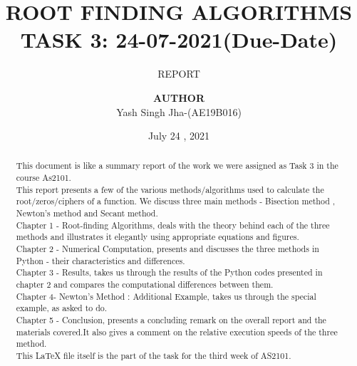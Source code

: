 \documentclass[a4paper, 12pt]{report}
\institute{Department Of Aerospace Engineering}
\title{ROOT FINDING ALGORITHMS\\TASK 3: 24-07-2021(Due-Date) }
\subtitle{REPORT}
\author{\textbf{AUTHOR}\\Yash Singh Jha-(AE19B016)\\ }
\date{July 24 , 2021}
\begin{document}
    \maketitle
    \romantableofcontents
    \listoffigures
    \listoftables
    \begin{abstract}
    This document is like a summary report of the work we were assigned as Task 3 in the course As2101.\\
    This report presents a few of the various methods/algorithms used to calculate the root/zeros/ciphers of a function. We discuss three main methods - Bisection method , Newton's method and Secant method.\\
    Chapter 1 - Root-finding Algorithms, deals with the theory behind each of the three methods and illustrates it elegantly using appropriate equations and figures.\\
    Chapter 2 - Numerical Computation, presents and discusses the three methods in Python -  their characteristics and differences.\\
    Chapter 3 - Results, takes us through the results of the Python codes presented in chapter 2 and compares the computational differences between them.\\
    Chapter 4- Newton's Method : Additional Example, takes us through the special example, as asked to do.\\
    Chapter 5 - Conclusion, presents a concluding remark on the overall report and the materials covered.It also gives a comment on the relative execution speeds of the three method.\\
    This LaTeX file itself is the part of the task for the third week of AS2101.
    \end{abstract}
    
\end{document}
